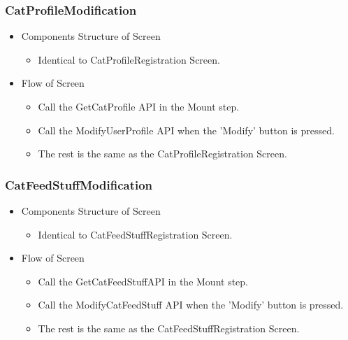 \documentclass[conference]{IEEEtran}
\begin{document}
\subsubsection{CatProfileModification}
\begin{itemize}
    \item Components Structure of Screen
    \begin{itemize}
        \item Identical to CatProfileRegistration Screen.
    \end{itemize}
    \item Flow of Screen
    \begin{itemize}
        \item Call the GetCatProfile API in the Mount step.
        \item Call the ModifyUserProfile API when the 'Modify' button is pressed.
        \item The rest is the same as the CatProfileRegistration Screen.\\
    \end{itemize}
\end{itemize}

\subsubsection{CatFeedStuffModification}
\begin{itemize}
    \item Components Structure of Screen
    \begin{itemize}
        \item Identical to CatFeedStuffRegistration Screen.
    \end{itemize}
    \item Flow of Screen
    \begin{itemize}
        \item Call the GetCatFeedStuffAPI in the Mount step.
        \item Call the ModifyCatFeedStuff API when the 'Modify' button is pressed.
        \item The rest is the same as the CatFeedStuffRegistration Screen.\\
    \end{itemize}
\end{itemize}
\end{document}
